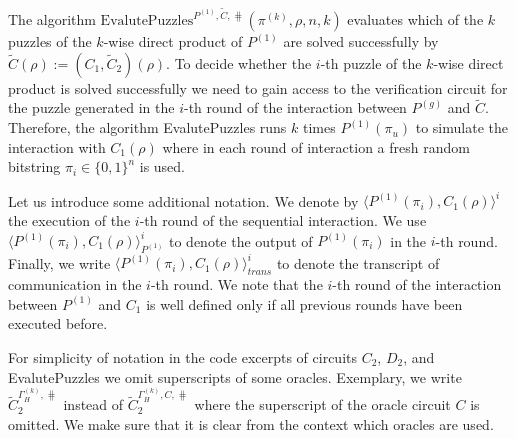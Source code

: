 %
The algorithm $\text{EvalutePuzzles}^{P^{(1)}, \widetilde{C}, \hash}(\pi^{(k)}, \rho, n, k)$
evaluates which of the $k$ puzzles of the $k$-wise direct product of $P^{(1)}$ are solved successfully by $\widetilde{C}(\rho) := (C_1,\widetilde{C}_2)(\rho)$.
To decide whether the $i$-th puzzle of the $k$-wise direct product is solved successfully we need to gain access to the verification circuit
for the puzzle generated in the $i$-th round of the interaction between $P^{(g)}$ and $\widetilde{C}$.
Therefore, the algorithm EvalutePuzzles runs $k$ times $P^{(1)}(\pi_u)$ to simulate the interaction with
$C_1(\rho)$ where in each round of interaction a fresh random bitstring $\pi_i \in \{0,1\}^{n}$ is used.

Let us introduce some additional notation.
We denote by $\langle P^{(1)}(\pi_i), C_1(\rho)\rangle^i$ the execution of the $i$-th round of the sequential interaction.
We use $\langle P^{(1)}(\pi_i), C_1(\rho)\rangle^i_{P^{(1)}}$ to denote the output of $P^{(1)}(\pi_i)$ in the $i$-th round.
Finally, we write $\langle P^{(1)}(\pi_i), C_1(\rho)\rangle^i_{\mathit{trans}}$ to denote the transcript of communication in the $i$-th round.
We note that the $i$-th round of the interaction between $P^{(1)}$ and $C_1$ is well defined only if all previous rounds have been executed before.

For simplicity of notation in the code excerpts of circuits $C_2$, $D_2$, and EvalutePuzzles we
omit superscripts of some oracles. Exemplary, we write $\widetilde{C}_2^{\Gamma_H^{(k)}, \hash}$ instead of $\widetilde{C}_2^{\Gamma_H^{(k)}, C, \hash}$ where
the superscript of the oracle circuit $C$ is omitted. We make sure that it is clear from the context which oracles are used.

